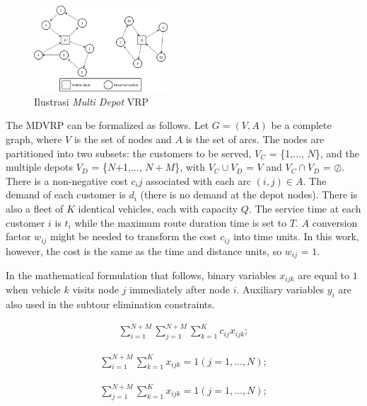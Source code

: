 \documentclass[conference]{IEEEtran}
\begin{document}
\begin{figure}[h]
	\centering
	\includegraphics[width=5cm]{Resources/Images/mdvrp-illustration}
	\caption{Ilustrasi \textit{Multi Depot} VRP}
	\label{fig:mdvrp-illustration}
\end{figure}


The MDVRP can be formalized as follows. Let $G = (V, A)$ be a complete graph, where $V$ is the set of nodes and $A$ is the set of arcs. The nodes are partitioned into two subsets: the customers to be served, $V_C$ = \{1,..., $N$\}, and the multiple depots $V_D$ = \{$N$+1,..., $N+M$\}, with $V_C \cup V_D$ = $V$ and $V_C \cap V_D$ = $\oslash$. There is a non-negative cost $c_ij$ associated with each arc $(i, j) \in A$. The demand of each customer is $d_i$ (there is no demand at the depot nodes). There is also a fleet of $K$ identical vehicles, each with capacity $Q$. The service time at each customer $i$ is $t_i$ while the maximum route duration time is set to $T$. $A$ conversion factor $w_{ij}$ might be needed to transform the cost $c_{ij}$ into time units. In this work, however, the cost is the same as the time and distance units, so $w_{ij}$ = $1$.


In the mathematical formulation that follows, binary variables $x_{ijk}$ are equal to $1$ when vehicle $k$ visits node $j$ immediately after node $i$. Auxiliary variables $y_i$ are also used in the subtour elimination constraints.


\begin{equation}
\label{eq:1}
\begin{aligned}
\sum_{i=1}^{N+M}\sum_{j=1}^{N+M}\sum_{k=1}^{K}c_{ij}x_{ijk};
\end{aligned}
\end{equation}

\begin{equation}
\label{eq:2}
\begin{aligned}
\sum_{i=1}^{N+M}\sum_{k=1}^{K}x_{ijk} = 1  (j=1,..., N);
\end{aligned}
\end{equation}

\begin{equation}
\label{eq:3}
\begin{aligned}
\sum_{j=1}^{N+M}\sum_{k=1}^{K}x_{ijk} = 1  (j=1,..., N);
\end{aligned}
\end{equation}
\end{document}
